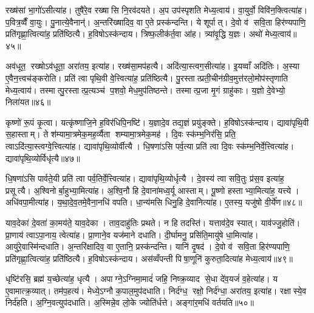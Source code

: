 रख्ष॑सां भा॒गो॑ऽसीत्या॑ह। तुषै॑रे॒व रख्षासि नि॒रव॑दयते। अ॒प उप॑स्पृशति मेध्य॒त्वाय॑। वा॒युर्वो॒ विवि॑न॒क्त्वित्या॑ह। प॒वित्र॒व्वैँ वा॒युः। पु॒नात्ये॒वैनान्॑। अ॒न्तरि॑ख्षादिव॒ वा ए॒ते प्रस्क॑न्दन्ति। ये शूर्पात्। दे॒वो व॑ सवि॒ता हिर॑ण्यपाणि॒ प्रति॑गृह्णा॒त्वित्या॑ह॒ प्रति॑ष्ठित्यै। ह॒विषोऽस्क॑न्दाय। त्रिष्फ॒लीक॑र्त॒वा आ॑ह। त्र्या॑वृ॒द्धि य॒ज्ञः। अथो॑ मेध्य॒त्वाय॑॥४५॥\anuvakamend[द्वाभ्या॒मुत्पु॑नाति र॒श्मयो॑ नय॒न्त्यग्रे॑ य॒ज्ञप॑तिय्यँ॒ज्ञोऽदि॑ति॒रस्क॑न्दाय गृह्णा॒मीत्या॑ह व॒देत्या॑ह॒ विजि॑त्या॒ अप॑हत्या॒ अस्क॑न्दाय॒ त्रीणि॑ च]

अव॑धूत॒ रख्षोऽव॑धूता॒ अरा॑तय॒ इत्या॑ह। रख्ष॑सा॒मप॑हत्यै। अदि॑त्या॒स्त्वग॒सीत्या॑ह। इ॒यव्वाँ अदि॑तिः। अ॒स्या ए॒वैन॒त्त्वच॑ङ्करोति। प्रति॑ त्वा पृथि॒वी वे॒त्त्वित्या॑ह॒ प्रति॑ष्ठित्यै। पु॒रस्तात्प्रती॒चीन॑ग्रीव॒मुत्त॑रलो॒मोप॑स्तृणाति मेध्य॒त्वाय॑। तस्मात्पु॒रस्तात्प्र॒त्यञ्च॑ प॒शवो॒ मेध॒मुप॑तिष्ठन्ते। तस्मात्प्र॒जा मृ॒गं ग्राहु॑काः। य॒ज्ञो दे॒वेभ्यो॒ निला॑यत॥४६॥

कृष्णो॑ रू॒पं कृ॒त्वा। यत्कृ॑ष्णाजि॒ने ह॒विर॑धिपि॒नष्टि॑। य॒ज्ञादे॒व तद्य॒ज्ञं प्रयु॑ङ्क्ते। ह॒विषोऽस्क॑न्दाय। द्यावा॑पृथि॒वी स॒हास्ताम्। ते श॑म्यामा॒त्रमेक॒मह॒र्व्यैता शम्यामा॒त्रमेक॒मह॑। दि॒वः स्क॑म्भ॒निर॑सि॒ प्रति॒ त्वाऽदि॑त्या॒स्त्वग्वे॒त्त्वित्या॑ह। द्यावा॑पृथि॒व्योर्वीत्यै। धि॒षणा॑ऽसि पर्व॒त्या प्रति॑ त्वा दि॒वः स्क॑म्भ॒निर्वे॒त्त्वित्या॑ह। द्यावा॑पृथि॒व्योर्विधृ॑त्यै॥४७॥

धि॒षणा॑ऽसि पार्वते॒यी प्रति॑ त्वा पर्व॒तिर्वे॒त्त्वित्या॑ह। द्यावा॑पृथि॒व्योर्धृत्यै। दे॒वस्य॑ त्वा सवि॒तुः प्र॑स॒व इत्या॑ह॒ प्रसूत्यै। अ॒श्विनोर्बा॒हुभ्या॒मित्या॑ह। अ॒श्वि॒नौ हि दे॒वाना॑मध्व॒र्यू आस्ताम्। पू॒ष्णो हस्ताभ्या॒मित्या॑ह॒ यत्त्ये। अधि॑वपा॒मीत्या॑ह। य॒था॒दे॒व॒तमे॒वैना॒नधि॑ वपति। धा॒न्य॑मसि धिनु॒हि दे॒वानित्या॑ह। ए॒तस्य॒ यजु॑षो वी॒र्ये॑ण॥४८॥

याव॒देका॑ दे॒वता॑ का॒मय॑ते॒ याव॒देका। ताव॒दाहु॑तिः प्रथते। न हि तदस्ति॑। यत्ताव॑दे॒व स्यात्। याव॑ज्जु॒होति॑। प्रा॒णाय॑ त्वाऽपा॒नाय॒ त्वेत्या॑ह। प्रा॒णाने॒व यज॑माने दधाति। दी॒र्घामनु॒ प्रसि॑ति॒मायु॑षे धा॒मित्या॑ह। आयु॑रे॒वास्मि॑न्दधाति। अ॒न्तरि॑क्षादिव॒ वा ए॒तानि॒ प्रस्क॑न्दन्ति। यानि॑ दृ॒षद॑। दे॒वो व॑ सवि॒ता हिर॑ण्यपाणि॒ प्रति॑गृह्णा॒त्वित्या॑ह॒ प्रति॑ष्ठित्यै। ह॒विषोऽस्क॑न्दाय। अस॑व्वँपन्ती पिषा॒णूनि॑ कुरुता॒दित्या॑ह मेध्य॒त्वाय॑॥४९॥\anuvakamend[निला॑यत॒ विधृ॑त्यै वी॒र्ये॑ण स्कन्दन्ति च॒त्वारि॑ च]

धृष्टि॑रसि॒ ब्रह्म॑ य॒च्छेत्या॑ह॒ धृत्यै। अपाग्ने॒ऽग्निमा॒मादं॑ जहि॒ निष्क्र॒व्याद से॒धा दे॑व॒यजं॑ व॒हेत्या॑ह। य ए॒वामात्क्र॒व्यात्। तम॑प॒हत्य॑। मेध्ये॒ऽग्नौ क॒पाल॒मुप॑दधाति। निर्द॑ग्ध॒ रक्षो॒ निर्द॑ग्धा॒ अरा॑तय॒ इत्या॑ह। रक्षास्ये॒व निर्द॑हति। अ॒ग्नि॒वत्युप॑दधाति। अ॒स्मिन्ने॒व लो॒के ज्योति॑र्धत्ते। अङ्गा॑र॒मधि॑ वर्तयति॥५०॥

